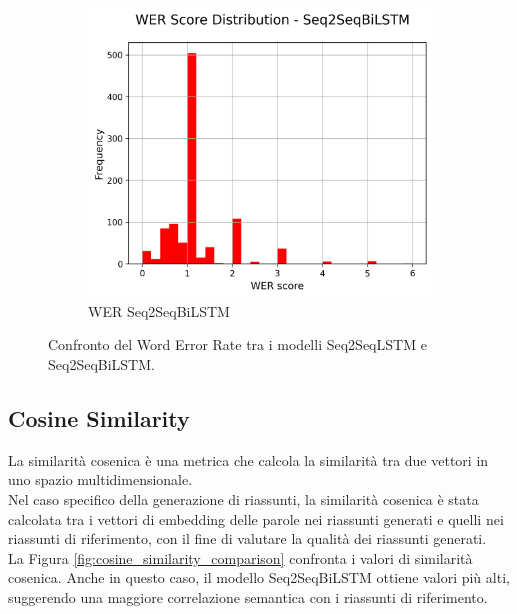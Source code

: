 \documentclass[a4paper, 12pt]{article}
\begin{document}
\begin{figure}[H]
\begin{subfigure}{0.45\textwidth}
        \includegraphics[width=\textwidth]{media/Seq2SeqBiLSTM_wer_scores.png}
        \caption{WER Seq2SeqBiLSTM}
    \end{subfigure}
    \caption{Confronto del Word Error Rate tra i modelli Seq2SeqLSTM e Seq2SeqBiLSTM.}
    \label{fig:wer_comparison}
\end{figure}

\subsection{Cosine Similarity}
La similarità cosenica è una metrica che calcola la similarità tra due vettori in uno spazio multidimensionale.\\
Nel caso specifico della generazione di riassunti, la similarità cosenica è stata calcolata tra i vettori di embedding delle parole nei riassunti generati e quelli nei riassunti di riferimento, con il fine di valutare la qualità dei riassunti generati.\\
La Figura \ref{fig:cosine_similarity_comparison} confronta i valori di similarità cosenica. Anche in questo caso, il modello Seq2SeqBiLSTM ottiene valori più alti, suggerendo una maggiore correlazione semantica con i riassunti di riferimento.
\end{document}
